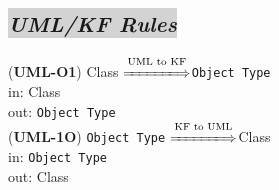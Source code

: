 \documentclass[sn-mathphys]{sn-jnl}
\begin{document}

\subsection{\colorbox{lightgray}{\em UML/KF Rules}}

({\bf UML-O1}) Class $\overset{\text{UML to KF}}{\xLongrightarrow{\hspace*{1.4cm}}}${\tt Object Type}\\
\hspace*{0.3cm}in: Class\\
\hspace*{0.5cm}out: {\tt Object Type}\\

({\bf UML-1O}) {\tt Object Type} $\overset{\text{KF to UML}}{\xLongrightarrow{\hspace*{1.4cm}}}${Class}\\
\hspace*{0.3cm}in: {\tt Object Type}\\
\hspace*{0.5cm}out: Class\\
\end{document}

